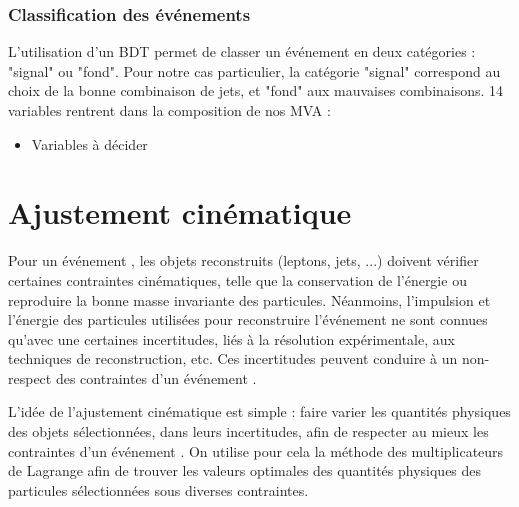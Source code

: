 
\subsubsection{Classification des événements \ttbar}

L'utilisation d'un BDT permet de classer un événement en deux catégories : "signal" ou "fond". Pour notre cas particulier, la catégorie "signal" correspond au choix de la bonne combinaison de jets, et "fond" aux mauvaises combinaisons. 14 variables rentrent dans la composition de nos MVA :

\begin{itemize}
    \item Variables à décider
\end{itemize}




\section{Ajustement cinématique}

Pour un événement \ttbar, les objets reconstruits (leptons, jets, ...) doivent vérifier certaines contraintes cinématiques, telle que la conservation de l'énergie ou reproduire la bonne masse invariante des particules. Néanmoins, l'impulsion et l'énergie des particules utilisées pour reconstruire l'événement \ttbar ne sont connues qu'avec une certaines incertitudes, liés à la résolution expérimentale, aux techniques de reconstruction, etc. Ces incertitudes peuvent conduire à un non-respect des contraintes d'un événement \ttbar.

\medskip

L'idée de l'ajustement cinématique est simple : faire varier les quantités physiques des objets sélectionnées, dans leurs incertitudes, afin de respecter au mieux les con\-traintes d'un événement \ttbar. On utilise pour cela la méthode des multiplicateurs de Lagrange afin de trouver les valeurs optimales des quantités physiques des particules sélectionnées sous diverses contraintes.

